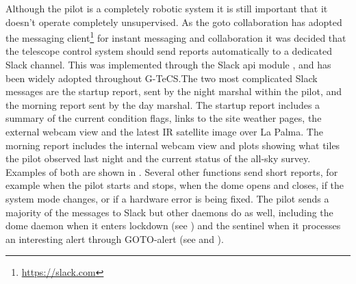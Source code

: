 \begin{colsection}
\begin{colsection}
Although the pilot is a completely robotic system it is still important that it doesn't operate completely unsupervised. As the \gls{goto} collaboration has adopted the  messaging client\footnote{\url{https://slack.com}} for instant messaging and collaboration it was decided that the telescope control system should send reports automatically to a dedicated Slack channel. This was implemented through the  Slack \gls{api} module , and has been widely adopted throughout G-TeCS.\@ The two most complicated Slack messages are the startup report, sent by the night marshal within the pilot, and the morning report sent by the day marshal. The startup report includes a summary of the current condition flags, links to the site weather pages, the external webcam view and the latest IR satellite image over La Palma. The morning report includes the internal webcam view and plots showing what tiles the pilot observed last night and the current status of the all-sky survey. Examples of both are shown in . Several other functions send short reports, for example when the pilot starts and stops, when the dome opens and closes, if the system mode changes, or if a hardware error is being fixed. The pilot sends a majority of the messages to Slack but other daemons do as well, including the dome daemon when it enters lockdown (see ) and the sentinel when it processes an interesting alert through GOTO-alert (see  and ).


\end{colsection}
\end{colsection}
